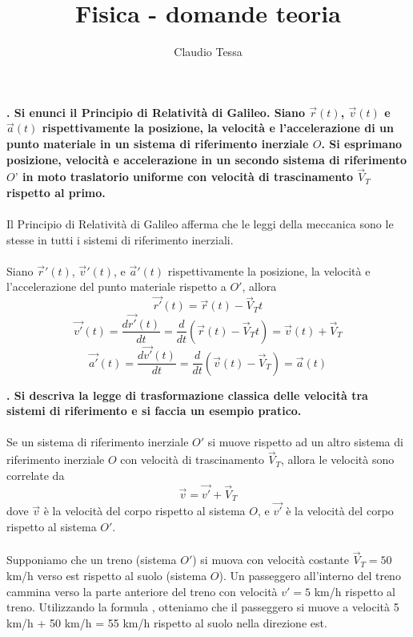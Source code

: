 \documentclass[12pt, a4paper]{article}
\title{Fisica - domande teoria}
\author{Claudio Tessa}
\date{\the\year}
\begin{document}
\maketitle




\noindent
\textbf{. Si enunci il Principio di Relatività di Galileo. Siano $\vec r(t)$, $\vec v(t)$ e $\vec a(t)$ rispettivamente la posizione, la velocità e  l’accelerazione di un punto materiale in un sistema di riferimento inerziale $O$. Si esprimano posizione, velocità e accelerazione in un secondo sistema di riferimento $O’$ in moto traslatorio uniforme con velocità di trascinamento $\vec V_T$ rispetto al primo.}
\\
\\
Il Principio di Relatività di Galileo afferma che le leggi della meccanica sono le stesse in tutti i sistemi di riferimento inerziali.
\\
\\
Siano $\vec r'(t)$, $\vec v'(t)$, e $\vec a'(t)$ rispettivamente la posizione, la velocità e l'accelerazione del punto materiale rispetto a $O'$, allora
\[
	\vec {r'}(t) = \vec r(t) - \vec V_T t
\]
\[
	\vec {v'}(t) = \frac{d \vec {r'}(t)}{dt} = \frac{d}{dt}\left( \vec r(t) - \vec V_T t\right) = \vec v(t) + \vec V_T
\]
\[
	\vec {a'}(t) = \frac{d \vec{v'}(t)}{dt} = \frac{d}{dt}\left( \vec v(t) - \vec V_T \right) = \vec a(t)
\]
\vspace{1cm}


\noindent
\textbf{. Si descriva la legge di trasformazione classica delle velocità tra sistemi di riferimento e si faccia un esempio
	pratico.}
\\
\\
Se un sistema di riferimento inerziale $O'$ si muove rispetto ad un altro sistema di riferimento inerziale $O$ con velocità di trascinamento $\vec V_T$, allora le velocità sono correlate da
\[
	\vec{v} = \vec {v'} + \vec V_T
\]
dove $\vec v$ è la velocità del corpo rispetto al sistema $O$, e $\vec{v'}$ è la velocità del corpo rispetto al sistema $O'$.
\\
\\
Supponiamo che un treno (sistema $O'$) si muova con velocità costante $\vec V_T = 50$ km/h verso est rispetto al suolo (sistema $O$). Un passeggero all'interno del treno cammina verso la parte anteriore del treno con velocità $v' = 5$ km/h rispetto al treno. Utilizzando la formula , otteniamo che il passeggero si muove a velocità 5 km/h + 50 km/h = 55 km/h rispetto al suolo nella direzione est.



\end{document}

